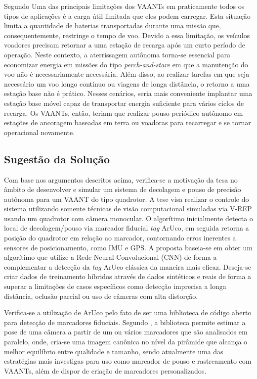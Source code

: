 Segundo \citet{Gilberto2016} Uma das principais limitações dos VAANTs em praticamente todos os tipos de aplicações é a carga útil limitada que eles podem carregar. Esta situação limita a quantidade de baterias transportadas durante uma missão que, consequentemente, restringe o tempo de voo. Devido a essa limitação, os veículos voadores precisam retornar a uma estação de recarga após um curto período de operação. Neste contexto, a aterrissagem autônoma torna-se essencial para economizar energia em missões do tipo \textit{perch-and-stare} em que a manutenção do voo não é necessariamente necessária. Além disso, ao realizar tarefas em que seja necessário um voo longo contínuo ou viagens de longa distância, o retorno a uma estação base não é prático. Nesses cenários, seria mais conveniente implantar uma estação base móvel capaz de transportar energia suficiente para vários ciclos de recarga. Os VAANTs, então, teriam que realizar pouso periódico autônomo em estações de ancoragem baseadas em terra ou voadoras para recarregar e se tornar operacional novamente.

\subsection{Sugestão da Solução}

Com base nos argumentos descritos acima, verifica-se a motivação da tesa no âmbito de desenvolver e simular um sistema de decolagem e pouso de precisão autônoma para um VAANT do tipo quadrotor. A tese visa realizar o controle do sistema utilizando somente técnicas de visão computacional simuladas via V-REP usando um quadrotor com câmera monocular. O algorítimo inicialmente detecta o local de decolagem/pouso via marcador fiducial \textit{tag} ArUco, em seguida retorna a posição do quadrotor em relação ao marcador, contornando erros inerentes a sensores de posicionamento, como IMU e GPS. A proposta baseia-se em obter um algorítimo que utilize a Rede Neural Convolucional (CNN) de forma a complementar a detecção da \textit{tag} ArUco clássica da maneira mais eficaz. Deseja-se criar dados de treinamento híbridos através de dados sintéticos e reais de forma a superar a limitações de casos específicos como detecção imprecisa a longa distância, oclusão parcial ou uso de câmeras com alta distorção. 

Verifica-se a utilização de ArUco pelo fato de ser uma biblioteca de código aberto para detecção de marcadores fiduciais. Segundo \citet{Aruco2014}, a biblioteca permite estimar a pose de uma câmera a partir de um ou vários marcadores que são analisados em paralelo, onde, cria-se uma imagem canônica no nível da pirâmide que alcança o melhor equilíbrio entre qualidade e tamanho, sendo atualmente uma das estratégias mais investigas para uso como marcador de pouso e rastreamento com VAANTs, além de dispor de criação de marcadores personalizados. 


